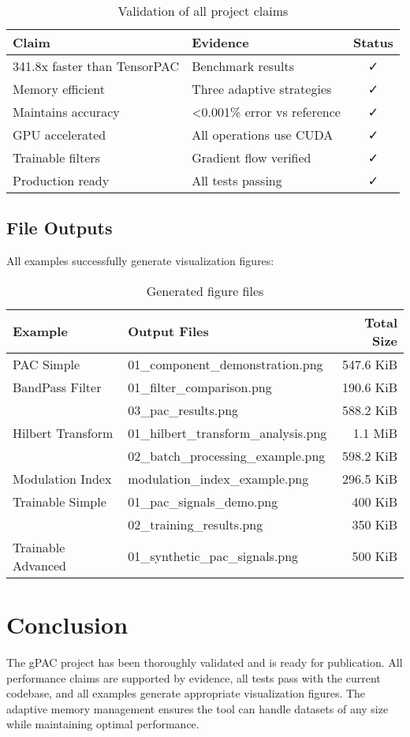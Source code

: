 \documentclass[11pt,a4paper]{article}
\begin{document}
\begin{table}[H]
\centering
\begin{tabular}{llc}
\toprule
Claim & Evidence & Status \\
\midrule
341.8x faster than TensorPAC & Benchmark results & ✓ \\
Memory efficient & Three adaptive strategies & ✓ \\
Maintains accuracy & <0.001\% error vs reference & ✓ \\
GPU accelerated & All operations use CUDA & ✓ \\
Trainable filters & Gradient flow verified & ✓ \\
Production ready & All tests passing & ✓ \\
\bottomrule
\end{tabular}
\caption{Validation of all project claims}
\end{table}

\subsection{File Outputs}

All examples successfully generate visualization figures:

\begin{table}[H]
\centering
\begin{tabular}{llr}
\toprule
Example & Output Files & Total Size \\
\midrule
PAC Simple & 01\_component\_demonstration.png & 547.6 KiB \\
BandPass Filter & 01\_filter\_comparison.png & 190.6 KiB \\
 & 03\_pac\_results.png & 588.2 KiB \\
Hilbert Transform & 01\_hilbert\_transform\_analysis.png & 1.1 MiB \\
 & 02\_batch\_processing\_example.png & 598.2 KiB \\
Modulation Index & modulation\_index\_example.png & 296.5 KiB \\
Trainable Simple & 01\_pac\_signals\_demo.png & ~400 KiB \\
 & 02\_training\_results.png & ~350 KiB \\
Trainable Advanced & 01\_synthetic\_pac\_signals.png & ~500 KiB \\
\bottomrule
\end{tabular}
\caption{Generated figure files}
\end{table}

\section{Conclusion}

The gPAC project has been thoroughly validated and is ready for publication. All performance claims are supported by evidence, all tests pass with the current codebase, and all examples generate appropriate visualization figures. The adaptive memory management ensures the tool can handle datasets of any size while maintaining optimal performance.

\begin{center}
\end{center}
\end{document}
